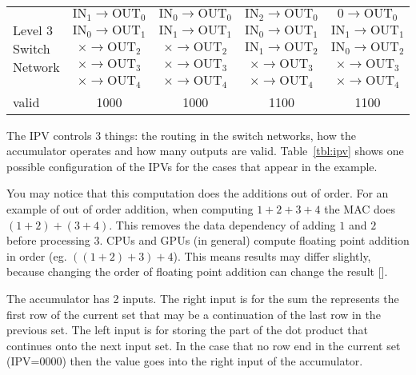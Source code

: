 \begin{table}
\begin{tabular}{m{2cm}cccc}
        \multirow{5}{*}{\parbox{2cm}{\centering Level 3 Switch Network}} &
        $\textrm{IN}_1 \rightarrow \textrm{OUT}_0$ &
        $\textrm{IN}_0 \rightarrow \textrm{OUT}_0$ &
        $\textrm{IN}_2 \rightarrow \textrm{OUT}_0$ &
        $0 \rightarrow \textrm{OUT}_0$\\
        & $\textrm{IN}_0 \rightarrow \textrm{OUT}_1$ &
        $\textrm{IN}_1 \rightarrow \textrm{OUT}_1$ &
        $\textrm{IN}_0 \rightarrow \textrm{OUT}_1$ &
        $\textrm{IN}_1 \rightarrow \textrm{OUT}_1$\\
        & $\times \rightarrow \textrm{OUT}_2$ &
        $\times \rightarrow \textrm{OUT}_2$ &
        $\textrm{IN}_1 \rightarrow \textrm{OUT}_2$ &
        $\textrm{IN}_0 \rightarrow \textrm{OUT}_2$\\
        & $\times \rightarrow \textrm{OUT}_3$ &
        $\times \rightarrow \textrm{OUT}_3$ &
        $\times \rightarrow \textrm{OUT}_3$ &
        $\times \rightarrow \textrm{OUT}_3$\\
        & $\times \rightarrow \textrm{OUT}_4$ &
        $\times \rightarrow \textrm{OUT}_4$ &
        $\times \rightarrow \textrm{OUT}_4$ &
        $\times \rightarrow \textrm{OUT}_4$\\

        \hline
        valid & 1000 & 1000 & 1100 & 1100 \\ 
        \hline
    \end{tabular}
\end{table}

The IPV controls 3 things: the routing in the switch networks, how the accumulator operates and how many outputs are valid. Table~\ref{tbl:ipv} shows one possible configuration of the IPVs for the cases that appear in the example.

You may notice that this computation does the additions out of order. For an example of out of order addition, when computing $1+2+3+4$ the MAC does $(1+2)+(3+4)$. This removes the data dependency of adding $1$ and $2$ before processing $3$. CPUs and GPUs (in general) compute floating point addition in order (eg. $\left((1+2)+3\right)+4$). This means results may differ slightly, because changing the order of floating point addition can change the result [\cite{prelim:goldberg}].

The accumulator has 2 inputs. The right input is for the sum the represents the first row of the current set that may be a continuation of the last row in the previous set. The left input is for storing the part of the dot product that continues onto the next input set. In the case that no row end in the current set (IPV=0000) then the value goes into the right input of the accumulator.

